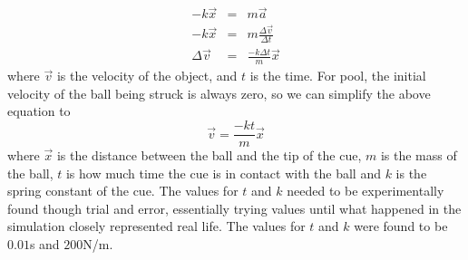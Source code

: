 \documentclass[12pt]{article}
\begin{document}
        \begin{eqnarray}
            -k \vec x &=& m \vec a \nonumber \\
            -k \vec x &=& m \frac{\Delta \vec v}{\Delta t} \nonumber \\
            \Delta \vec v &=& \frac{-k \Delta t}{m}\vec x  \nonumber
        \end{eqnarray}
        where $\vec v$ is the velocity of the object, and $t$ is the time. For pool, the initial velocity of the ball being struck is
        always zero, so we can simplify the above equation to
        \begin{equation}
            \vec v = \frac{-k t}{m}\vec x
            \label{equ:shot_velocity}
        \end{equation}
        where $\vec x$ is the distance between the ball and the tip of the cue, $m$ is the mass of the ball, $t$ is how much time the
        cue is in contact with the ball and $k$ is the spring constant of the cue. The values for $t$ and $k$ needed to be experimentally
        found though trial and error, essentially trying values until what happened in the simulation closely represented real life. The
        values for $t$ and $k$ were found to be $0.01$s and $200$N/m.
        
\end{document}
